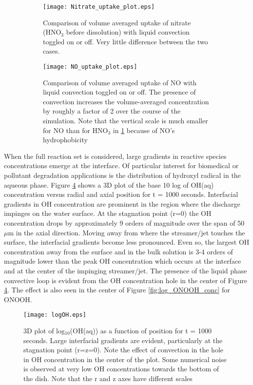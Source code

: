 \documentclass[12pt]{article}
\begin{document}
\begin{figure}[htpb]
    \centering
    \begin{subfigure}[b]{.63\textwidth}
        \texttt{[image: Nitrate\_uptake\_plot.eps]}
        \caption{Comparison of volume averaged uptake of nitrate (HNO$_3$ before dissolution) with liquid convection toggled on or off. Very little difference between the two cases.}
        \label{fig:HNO3_mass_compare}
    \end{subfigure}
    \begin{subfigure}[b]{.63\textwidth}
        \texttt{[image: NO\_uptake\_plot.eps]}
        \caption{Comparison of volume averaged uptake of NO with liquid convection toggled on or off. The presence of convection increases the volume-averaged concentration by roughly a factor of 2 over the course of the simulation. Note that the vertical scale is much smaller for NO than for HNO$_3$ in \ref{fig:HNO3_mass_compare} because of NO's hydrophobicity}
        \label{fig:NO_mass_compare}
    \end{subfigure}
    \caption{}
    \label{fig:excel}
\end{figure}

When the full reaction set is considered, large gradients in reactive species concentrations emerge at the interface. Of particular interest for biomedical or pollutant degradation applications is the distribution of hydroxyl radical in the aqueous phase. Figure \ref{fig:log_OH_conc} shows a 3D plot of the base 10 log of OH(aq) concentration versus radial and axial position for t = 1000 seconds. Interfacial gradients in OH concentration are prominent in the region where the discharge impinges on the water surface. At the stagnation point (r=0) the OH concentration drops by approximately 9 orders of magnitude over the span of 50 $\mu$m in the axial direction. Moving away from where the streamer/jet touches the surface, the interfacial gradients become less pronounced. Even so, the largest OH concentration away from the surface and in the bulk solution is 3-4 orders of magnitude lower than the peak OH concentration which occurs at the interface and at the center of the impinging streamer/jet. The presence of the liquid phase convective loop is evident from the OH concentration hole in the center of Figure \ref{fig:log_OH_conc}. The effect is also seen in the center of Figure \ref{fig:log_ONOOH_conc} for ONOOH.

\begin{figure}[htb]
    \centering
    \texttt{[image: logOH.eps]}
    \caption{3D plot of log$_{10}$(OH(aq)) as a function of position for t = 1000 seconds. Large interfacial gradients are evident, particularly at the stagnation point (r=z=0). Note the effect of convection in the hole in OH concentration in the center of the plot. Some numerical noise is observed at very low OH concentrations towards the bottom of the dish. Note that the r and z axes have different scales}
    \label{fig:log_OH_conc}
\end{figure}
\end{document}
